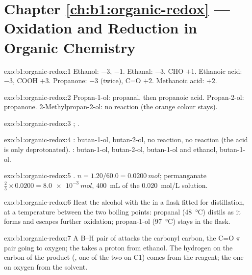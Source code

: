 \section*{Chapter \ref{ch:b1:organic-redox} --- Oxidation and Reduction in Organic Chemistry}

\begin{solution}{exo:b1:organic-redox:1}
Ethanol:  $-3$,  $-1$. Ethanal:  $-3$, CHO $+1$.
Ethanoic acid:  $-3$, COOH $+3$. Propanone:  $-3$ (twice),
C=O $+2$. Methanoic acid: $+2$.
\end{solution}

\begin{solution}{exo:b1:organic-redox:2}
Propan-1-ol: propanal, then propanoic acid. Propan-2-ol: propanone.
2-Methylpropan-2-ol: no reaction (the orange colour stays).
\end{solution}

\begin{solution}{exo:b1:organic-redox:3}
;
.
\end{solution}

\begin{solution}{exo:b1:organic-redox:4}
: butan-1-ol, butan-2-ol, no reaction, no reaction (the acid is
only deprotonated). : butan-1-ol, butan-2-ol, butan-1-ol and
ethanol, butan-1-ol.
\end{solution}

\begin{solution}{exo:b1:organic-redox:5}
.
$n = 1.20/60.0 = \qty{0.0200}{mol}$; permanganate $\frac25 \times 0.0200 =
\qty{8.0e-3}{mol}$, \qty{400}{mL} of the \qty{0.020}{mol/L} solution.
\end{solution}

\begin{solution}{exo:b1:organic-redox:6}
Heat the alcohol with the  in a flask fitted for distillation, at a
temperature between the two boiling points: propanal (\qty{48}{\celsius})
distils as it forms and escapes further oxidation; propan-1-ol
(\qty{97}{\celsius}) stays in the flask.
\end{solution}

\begin{solution}{exo:b1:organic-redox:7}
A B--H pair of  attacks the carbonyl carbon, the C=O $\pi$ pair
going to oxygen; the  takes a proton from ethanol. The hydrogen
on the carbon of the product (, one of the two on C1) comes
from the reagent; the one on oxygen from the solvent.
\end{solution}

